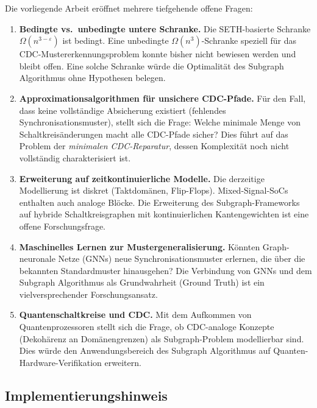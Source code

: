 ﻿\documentclass[a4paper,12pt]{article}
\theoremstyle{definition}
\begin{document}
	Die vorliegende Arbeit er\"offnet mehrere tiefgehende offene Fragen:
	
	\begin{enumerate}
		
		\item \textbf{Bedingte vs.\ unbedingte untere Schranke.}
		Die SETH-basierte Schranke $\Omega(n^{3-\varepsilon})$ ist bedingt.
		Eine unbedingte $\Omega(n^3)$-Schranke speziell f\"ur das
		CDC-Mustererkennungs\-problem konnte bisher nicht bewiesen werden und bleibt
		offen. Eine solche Schranke w\"urde die Optimalit\"at des Subgraph
		Algorithmus ohne Hypothesen belegen.
		
		\item \textbf{Approximationsalgorithmen f\"ur unsichere CDC-Pfade.}
		F\"ur den Fall, dass keine vollst\"andige Absicherung existiert
		(fehlendes Synchronisationsmuster), stellt sich die Frage:
		Welche minimale Menge von Schaltkreis\"anderungen macht alle
		CDC-Pfade sicher? Dies f\"uhrt auf das Problem der
		\emph{minimalen CDC-Reparatur}, dessen Komplexit\"at noch nicht
		vollst\"andig charakterisiert ist.
		
		\item \textbf{Erweiterung auf zeitkontinuierliche Modelle.}
		Die derzeitige Modellierung ist diskret (Taktdom\"anen, Flip-Flops).
		Mixed-Signal-SoCs enthalten auch analoge Bl\"ocke.
		Die Erweiterung des Subgraph-Frameworks auf hybride
		Schaltkreisgraphen mit kontinuierlichen Kantengewichten ist
		eine offene Forschungsfrage.
		
		\item \textbf{Maschinelles Lernen zur Mustergeneralisierung.}
		K\"onnten Graph-neuronale Netze (GNNs) neue Synchronisationsmuster
		erlernen, die \"uber die bekannten Standardmuster hinausgehen?
		Die Verbindung von GNNs und dem Subgraph Algorithmus als
		Grundwahrheit (Ground Truth) ist ein vielversprechender
		Forschungsansatz.
		
		\item \textbf{Quantenschaltkreise und CDC.}
		Mit dem Aufkommen von Quantenprozessoren stellt sich die Frage,
		ob CDC-analoge Konzepte (Dekoh\"arenz an Domänengrenzen) als
		Subgraph-Problem modellierbar sind. Dies w\"urde den Anwendungsbereich
		des Subgraph Algorithmus auf Quanten-Hardware-Verifikation erweitern.
		
	\end{enumerate}
	
	\subsection{Implementierungshinweis}
	
\end{document}
